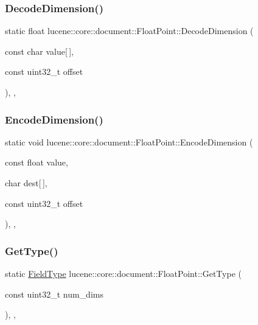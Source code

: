 \subsubsection{\texorpdfstring{Decode\+Dimension()}{DecodeDimension()}}
{\footnotesize\ttfamily static float lucene\+::core\+::document\+::\+Float\+Point\+::\+Decode\+Dimension (\begin{DoxyParamCaption}\item[{const char}]{value\mbox{[}$\,$\mbox{]},  }\item[{const uint32\+\_\+t}]{offset }\end{DoxyParamCaption})\hspace{0.3cm}{\ttfamily [inline]}, {\ttfamily [static]}, {\ttfamily [noexcept]}}

\mbox{\label{classlucene_1_1core_1_1document_1_1FloatPoint_ab8494f2f0e931bec1fdf34dec7954db9}} 
\subsubsection{\texorpdfstring{Encode\+Dimension()}{EncodeDimension()}}
{\footnotesize\ttfamily static void lucene\+::core\+::document\+::\+Float\+Point\+::\+Encode\+Dimension (\begin{DoxyParamCaption}\item[{const float}]{value,  }\item[{char}]{dest\mbox{[}$\,$\mbox{]},  }\item[{const uint32\+\_\+t}]{offset }\end{DoxyParamCaption})\hspace{0.3cm}{\ttfamily [inline]}, {\ttfamily [static]}, {\ttfamily [noexcept]}}

\mbox{\label{classlucene_1_1core_1_1document_1_1FloatPoint_a6f95b1c279cf34c497e0eaa2d7a19fdc}} 
\subsubsection{\texorpdfstring{Get\+Type()}{GetType()}}
{\footnotesize\ttfamily static \mbox{\hyperlink{classlucene_1_1core_1_1document_1_1FieldType}{Field\+Type}} lucene\+::core\+::document\+::\+Float\+Point\+::\+Get\+Type (\begin{DoxyParamCaption}\item[{const uint32\+\_\+t}]{num\+\_\+dims }\end{DoxyParamCaption})\hspace{0.3cm}{\ttfamily [inline]}, {\ttfamily [static]}, {\ttfamily [private]}}

